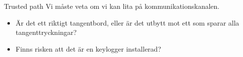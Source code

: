 
\begin{frame}
  \begin{block}{Trusted path}
    Vi måste veta om vi kan lita på kommunikationskanalen.
  \end{block}

  \pause{}

  \begin{example}
    \begin{itemize}
      \item Är det ett riktigt tangentbord, eller är det utbytt mot ett som 
        sparar alla tangenttryckningar?
      \item Finns risken att det är en keylogger installerad?
    \end{itemize}
  \end{example}
\end{frame}

